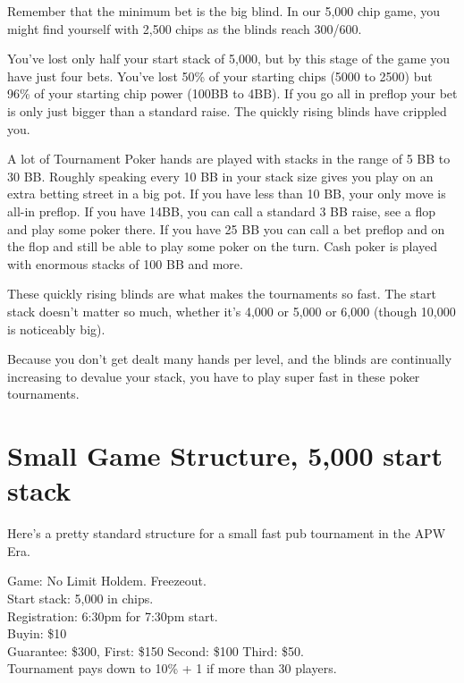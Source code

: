 Remember that the minimum bet is the big blind. In our 5,000 chip
game, you might find yourself with 2,500 chips as the blinds reach 300/600.

You've lost only half your start stack of 5,000, but by this
stage of the game you have just four bets. You've lost 50\% of your
starting chips (5000 to 2500) but 96\% of your starting chip power (100BB to
4BB). If you go all in preflop your bet is only just bigger than a standard
raise. The quickly rising blinds have crippled you.

A lot of Tournament Poker hands are played with stacks in the range of
5 BB to 30 BB. Roughly speaking every 10 BB in your stack size gives you
play on an extra betting street in a big pot. If you have less than
10 BB, your only move is all-in preflop. If you have 14BB, you can call
a standard 3 BB raise, see a flop and play some poker there. If you
have 25 BB you can call a bet preflop and on the flop and still be
able to play some poker on the turn. Cash poker is played with
enormous stacks of 100 BB and more.

These quickly rising blinds are what makes the tournaments so fast.
The start stack doesn't matter so much, whether it's 4,000 or 5,000
or 6,000 (though 10,000 is noticeably big).

Because you don't get dealt many hands per level, and the blinds are
continually increasing to devalue your stack, you have to play super fast
in these poker tournaments.

\section{Small Game Structure, 5,000 start stack}

Here's a pretty standard structure for a small fast pub tournament
in the APW Era.

Game: No Limit Holdem. Freezeout. \\
Start stack: 5,000 in chips. \\
Registration: 6:30pm for 7:30pm start. \\
Buyin: \$10 \\
Guarantee: \$300, First: \$150 Second: \$100 Third: \$50. \\
Tournament pays down to 10\% + 1 if more than 30 players.

